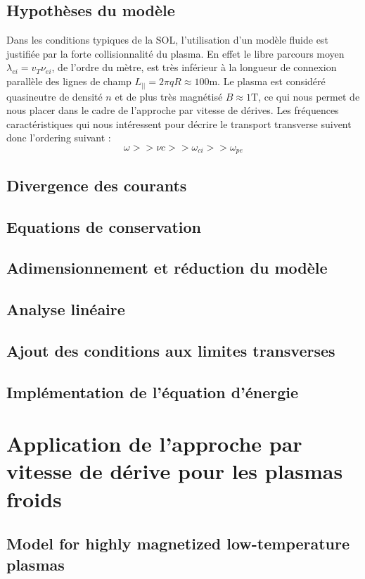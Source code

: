 		\subsection{Hypothèses du modèle}
Dans les conditions typiques de la SOL, l'utilisation d'un modèle fluide est justifiée par la
forte collisionnalité du plasma. En effet le libre parcours moyen $\lambda_{ei}=v_T
\nu_{ei}$, de l'ordre du mètre, est très inférieur à la longueur de connexion
parallèle des lignes de champ $L_{||}=2\pi q R\approx 100\text{m}$.
Le plasma est considéré quasineutre de densité $n$ et de plus très magnétisé $B\approx 1\text{T}$,
 ce qui nous permet de nous placer dans le cadre de
l'approche par vitesse de dérives. Les fréquences caractéristiques
qui nous intéressent pour décrire le transport transverse suivent donc l'ordering suivant :
\begin{equation}
	\omega>>\nu{c}>>\omega_{ci}>>\omega_{pe}
\end{equation}




		
		\subsection{Divergence des courants}
		\subsection{Equations de conservation}
		\subsection{Adimensionnement et réduction du modèle}
		\subsection{Analyse linéaire}
		\subsection{Ajout des conditions aux limites transverses}
		\subsection{Implémentation de l'équation d'énergie}
	\section{Application de l'approche par vitesse de dérive pour les plasmas froids}
		\subsection{Model for highly magnetized low-temperature plasmas}
